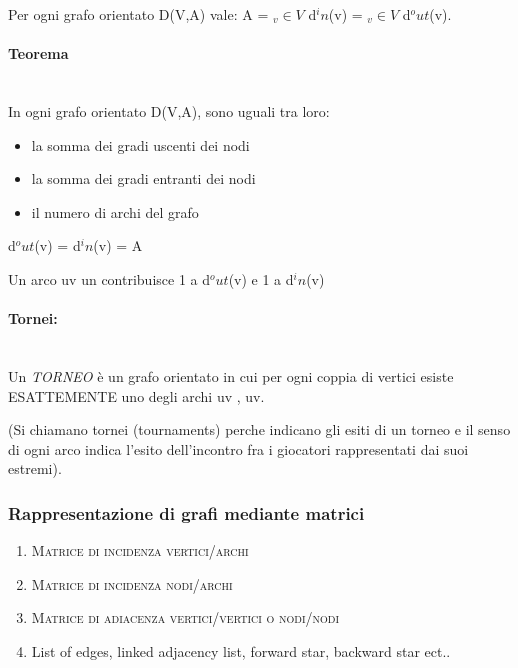 \documentclass[12pt,a4paper]{article}
\begin{document}
Per ogni grafo orientato D(V,A) vale: \mid A \mid = \sum $_v \in V$ d$^in$(v) = \sum $_v \in V$ d$^out$(v). \\

\paragraph{Teorema} \\

In ogni grafo orientato D(V,A), sono uguali tra loro:
\begin{itemize}
\item la somma dei gradi uscenti dei nodi
\item la somma dei gradi entranti dei nodi
\item il numero di archi del grafo
\end{itemize}

\begin{center}
\sum{} d$^out$(v) = \sum{} d$^in$(v) = \mid A \mid \\

\end{center}

Un arco uv un contribuisce 1 a d$^out$(v) e 1 a d$^in$(v)
\\

\paragraph{Tornei:} \\

Un \textit{TORNEO} è un grafo orientato in cui per ogni coppia di vertici esiste \textsc{ESATTEMENTE} uno degli archi uv , uv. \par
(Si chiamano tornei (tournaments) perche indicano gli esiti di un torneo e il senso di ogni arco indica l'esito dell'incontro fra i giocatori rappresentati dai suoi estremi).

\subsubsection{Rappresentazione di grafi mediante matrici}
\begin{enumerate}
\item \textsc{Matrice di incidenza vertici/archi}
\item \textsc{Matrice di incidenza nodi/archi}
\item \textsc{Matrice di adiacenza vertici/vertici o nodi/nodi}
\item List of edges, linked adjacency list, forward star, backward star ect..
\end{enumerate}


\textbf{}
\end{document}
